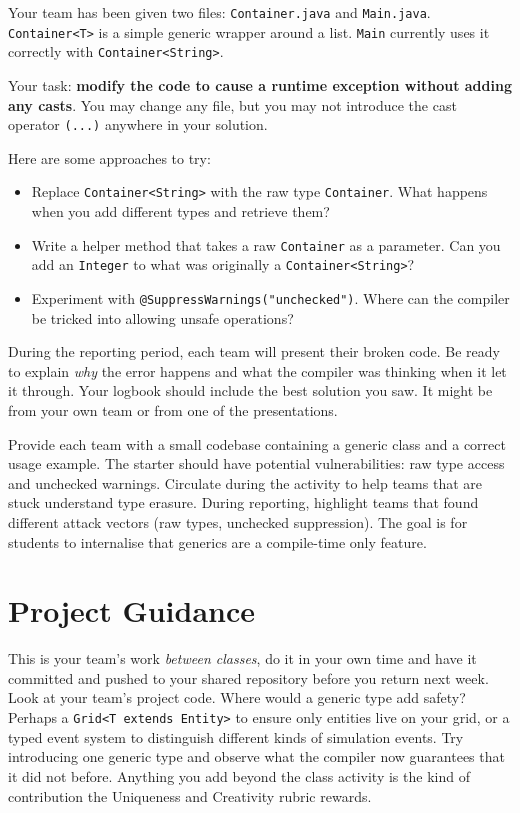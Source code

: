 \documentclass[twoside=false,DIV=14]{scrartcl}
\begin{document}
Your team has been given two files: \texttt{Container.java} and \texttt{Main.java}.  \texttt{Container<T>} is a simple generic wrapper around a list.  \texttt{Main} currently uses it correctly with \texttt{Container<String>}.

Your task: \textbf{modify the code to cause a runtime exception without adding any casts}.  You may change any file, but you may not introduce the cast operator \texttt{(...)} anywhere in your solution.

Here are some approaches to try:
\begin{itemize}
\itemsep0em
\item Replace \texttt{Container<String>} with the raw type \texttt{Container}.  What happens when you add different types and retrieve them?
\item Write a helper method that takes a raw \texttt{Container} as a parameter.  Can you add an \texttt{Integer} to what was originally a \texttt{Container<String>}?
\item Experiment with \texttt{@SuppressWarnings("unchecked")}.  Where can the compiler be tricked into allowing unsafe operations?
\end{itemize}

During the reporting period, each team will present their broken code.  Be ready to explain \emph{why} the error happens and what the compiler was thinking when it let it through.  Your logbook should include the best solution you saw.  It might be from your own team or from one of the presentations.

\begin{teacher}
Provide each team with a small codebase containing a generic class and a correct usage example.  The starter should have potential vulnerabilities: raw type access and unchecked warnings.  Circulate during the activity to help teams that are stuck understand type erasure.  During reporting, highlight teams that found different attack vectors (raw types, unchecked suppression).  The goal is for students to internalise that generics are a compile-time only feature.
\end{teacher}

\section*{Project Guidance}

This is your team's work \emph{between classes}, do it in your own time and have it committed and pushed to your shared repository before you return next week.  Look at your team's project code.  Where would a generic type add safety?  Perhaps a \texttt{Grid<T extends Entity>} to ensure only entities live on your grid, or a typed event system to distinguish different kinds of simulation events.  Try introducing one generic type and observe what the compiler now guarantees that it did not before.  Anything you add beyond the class activity is the kind of contribution the Uniqueness and Creativity rubric rewards.
\end{document}
